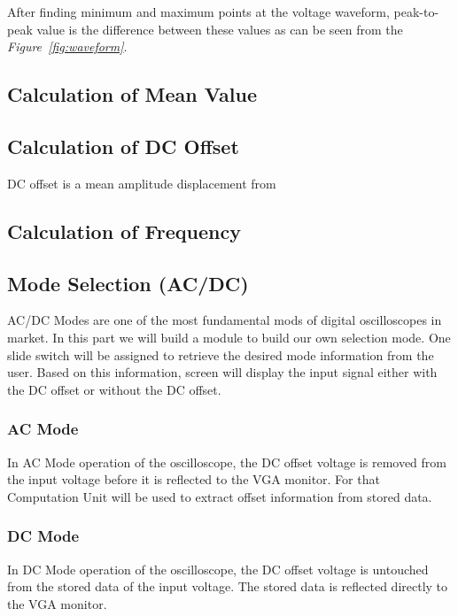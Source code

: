 \documentclass[paper]{IEEEtran}
\begin{document}
	After finding minimum and maximum points at the voltage waveform, peak-to-peak value is the difference between these values as can be seen from the \textit{Figure~\ref{fig:waveform}}.  	
	
	
\subsection{Calculation of Mean Value}


\subsection{Calculation of DC Offset}

DC offset is a mean amplitude displacement from


\subsection{Calculation of Frequency}



\subsection{Mode Selection (AC/DC)} \- \indent
	AC/DC Modes are one of the most fundamental mods of digital oscilloscopes in market. In this part we will build a module to build our own selection mode. One slide switch will be assigned to retrieve the desired mode information from the user. Based on this information, screen will display the input signal either with the DC offset or without the DC offset.

\subsubsection{AC Mode} \- \indent
	In AC Mode operation of the oscilloscope, the DC offset voltage is removed from the input voltage before it is reflected to the VGA monitor. For that Computation Unit will be used to extract offset information from stored data.

\subsubsection{DC Mode} \- \indent
	In DC Mode operation of the oscilloscope, the DC offset voltage is untouched from the stored data of the input voltage. The stored data is reflected directly to the VGA monitor. 
	
\end{document}
